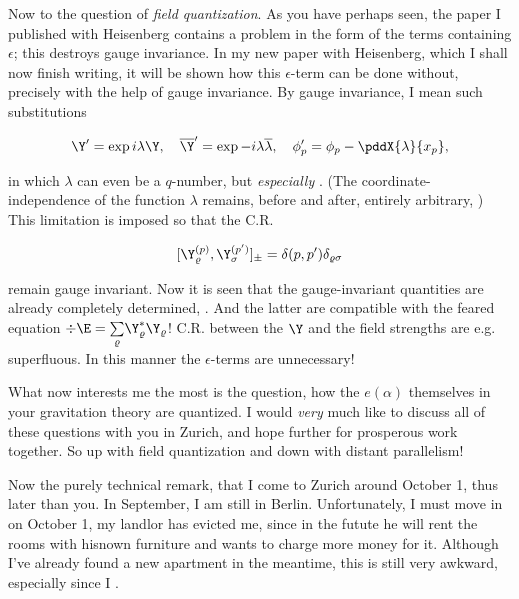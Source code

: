 \documentclass{article}
\newcommand{\uequ}[1]{
\begin{align*}
#1
\end{align*}
}
\newcommand{\sumX}[1]{\underset{#1}{\sum}}
\begin{document}
Now to the question of \textit{field quantization}. As you have perhaps seen, the paper I published with Heisenberg contains a problem in the form of the terms containing $\epsilon$; this destroys  gauge invariance. In my new paper with Heisenberg, which I shall now finish writing, it will be shown how this $\epsilon$-term can be done without, precisely with the help of gauge invariance. By gauge invariance, I mean such substitutions
\uequ{
\Y' = \exp{i\lambda}\Y,\quad
\overline{\Y}' = \exp{-i\lambda}\overline{\lambda},\quad
\phi'_p = \phi_p - \pddX{\lambda}{x_p},
}
in which $\lambda$ can even be a $q$-number, but \textit{especially} . (The coordinate-independence of the function $\lambda$ remains, before and after, entirely arbitrary, ) This limitation is imposed so that the C.R.
\uequ{
[\Y^{(p)}_\varrho, \Y^{(p')}_\sigma]_{\pm} = \delta(p,p')\delta_{\varrho\sigma}
}
remain gauge invariant. Now it is seen that the gauge-invariant quantities are already completely determined, . And the latter are compatible with the feared equation $\div{\E}=\sumX{\varrho}\Y^*_\varrho \Y_\varrho$! C.R. between the $\Y$ and the field strengths are e.g. superfluous. In this manner the $\epsilon$-terms are unnecessary!

What now interests me the most is the question, how the $e(\alpha)$ themselves in your gravitation theory are quantized. I would \textit{very} much like to discuss all of these questions with you in Zurich, and hope further for prosperous work together. So up with field quantization and down with distant parallelism!

Now the purely technical remark, that I come to Zurich around October 1, thus later than you. In September, I am still in Berlin. Unfortunately, I must move in on October 1, my landlor has evicted me, since in the futute he will rent the rooms with hisnown furniture and wants to charge more money for it. Although I've already found a new apartment in the meantime, this is still very awkward, especially since I .

\end{document}
